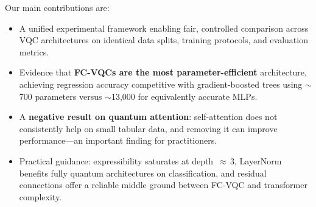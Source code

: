 Our main contributions are:
\begin{itemize}
  \item A unified experimental framework enabling fair, controlled comparison
    across VQC architectures on identical data splits, training protocols,
    and evaluation metrics.
  \item Evidence that \textbf{FC-VQCs are the most parameter-efficient}
    architecture, achieving regression accuracy competitive with
    gradient-boosted trees using ${\sim}$700 parameters versus
    ${\sim}$13{,}000 for equivalently accurate MLPs.
  \item A \textbf{negative result on quantum attention}: self-attention
    does not consistently help on small tabular data, and removing it can
    improve performance---an important finding for practitioners.
  \item Practical guidance: expressibility saturates at depth~${\approx}\,3$,
    LayerNorm benefits fully quantum architectures on classification, and
    residual connections offer a reliable middle ground between FC-VQC and
    transformer complexity.
\end{itemize}
